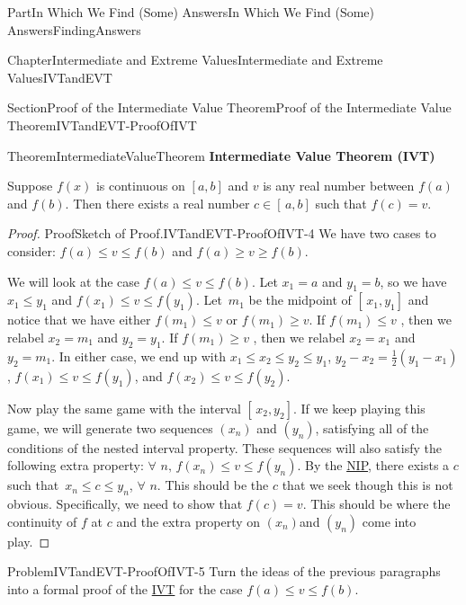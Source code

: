 \documentclass[oneside,10pt,]{book}
\newcommand{\terminology}[1]{\textbf{#1}}
\numberwithin{equation}{part}
\begin{document}
\begin{partptx}{Part}{In Which We Find (Some) Answers}{}{In Which We Find (Some) Answers}{}{}{FindingAnswers}
\begin{chapterptx}{Chapter}{Intermediate and Extreme Values}{}{Intermediate and Extreme Values}{}{}{IVTandEVT}
\begin{sectionptx}{Section}{Proof of the Intermediate Value Theorem}{}{Proof of the Intermediate Value Theorem}{}{}{IVTandEVT-ProofOfIVT}
\begin{theorem}{Theorem}{}{}{IntermediateValueTheorem}%
\terminology{Intermediate Value Theorem (IVT)}%
\par
{} Suppose \(f(x)\) is continuous on \([a,b]\) and \(v\) is any real number between \(f(a)\) and \(f(b)\).  Then there exists a real number \(c\in[\,a,b]\) such that \(f(c)=v\).%
\end{theorem}
\begin{proof}{Proof}{Sketch of Proof.}{IVTandEVT-ProofOfIVT-4}
We have two cases to consider: \(f(a)\leq v\leq f(b)\) and \(f(a)\geq v\geq f(b)\).%
\par
We will look at the case \(f(a)\leq v\leq f(b)\).  Let \(x_1=a\) and \(y_1=b\), so we have \(x_1\leq y_1\) and \(f(x_1)\leq v\leq f(y_1)\).  Let \(\,m_1\) be the midpoint of \([\,x_1,y_1]\) and notice that we have either \(f(m_1)\leq v\) or \(f(m_1)\geq v\).  If \(f(m_1)\leq
v\) , then we relabel \(x_2=m_1\) and \(y_2=y_1\).  If \(f(m_1)\geq v\) , then we relabel \(x_2=x_1\) and \(y_2=m_1\).  In either case, we end up with \(x_1\leq
x_2\leq y_2\leq y_1\), \(y_2-x_2=\frac{1}{2}\left(y_1-x_1\right)\), \(f(x_1)\leq
v\leq f(y_1)\), and \(f(x_2)\leq v\leq f(y_2)\).%
\par
Now play the same game with the interval \([\,x_2,y_2]\). If we keep playing this game, we will generate two sequences \(\left(x_n\right)\) and \(\left(y_n\right)\), satisfying all of the conditions of the nested interval property.  These sequences will also satisfy the following extra property: \(\forall\) \(n,\,f(x_n)\leq v\leq
f(y_n)\).  By the \hyperref[NIP]{NIP}, there exists a \(c\) such that \(\,x_n\leq c\leq y_n\), \(\forall\) \(n\).  This should be the \(c\) that we seek though this is not obvious.  Specifically, we need to show that \(f(c)=v\). This should be where the continuity of \(f\) at \(c\) and the extra property on \(\left(x_n\right)\)and \(\left(y_n\right)\) come into play.%
\end{proof}
\begin{problem}{Problem}{}{IVTandEVT-ProofOfIVT-5}%
 Turn the ideas of the previous paragraphs into a formal proof of the \hyperref[IntermediateValueTheorem]{IVT} for the case \(f(a)\leq v\leq f(b)\).%
\end{problem}
\end{sectionptx}
\end{chapterptx}
\end{partptx}
\end{document}

